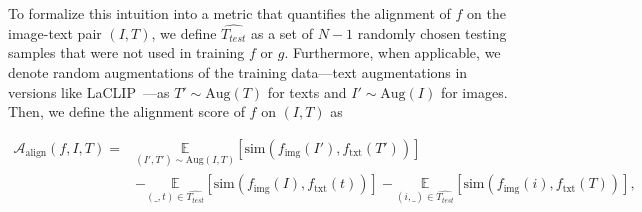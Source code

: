 To formalize this intuition into a metric that quantifies the alignment of $f$ on the image-text pair $(I, T)$, we define $\widehat{T_{test}}$ as a set of $N-1$ randomly chosen testing samples that were not used in training $f$ or $g$. %
Furthermore, when applicable, we denote random augmentations of the training data---\eg text augmentations in versions like LaCLIP~\citep{fan2023}---as $T'  \sim \text{Aug}(T)$ for texts and $I'  \sim \text{Aug}(I)$ for images.
Then, we define the alignment score of $f$ on $(I, T)$ as 

\begin{equation}
\begin{split}
\mathcal{A}_{\text{align}}(f, I, T) = & \underset{(I',T')  \sim \text{Aug}(I,T)}{\mathbb{E}} \left[\text{sim}(f_{\text{img}}(I'), f_{\text{txt}}(T'))\right] \\
& - \underset{(\_,t) \in \widehat{T_{test}}}{\mathbb{E}} \left[ \text{sim}(f_{\text{img}}(I), f_{\text{txt}}(t)) \right] - \underset{(i,\_) \in \widehat{T_{test}}}{\mathbb{E}} \left[ \text{sim}(f_{\text{img}}(i), f_{\text{txt}}(T)) \right] \text{,}
\end{split}
\end{equation}

